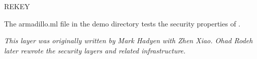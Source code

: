 \begin{Layer}{REKEY}
\begin{Sources}
\end{Sources}

\begin{GenEvent}
\genevent{\DnCast}
\genevent{\DnSend}
\end{GenEvent}

\begin{Testing}
\item 
The armadillo.ml file in the demo directory tests the security properties
of \ensemble.
\end{Testing}

\emph{This layer was originally written by Mark Hadyen with Zhen Xiao.
Ohad Rodeh later rewrote the security layers and related infrastructure.}
\end{Layer}


